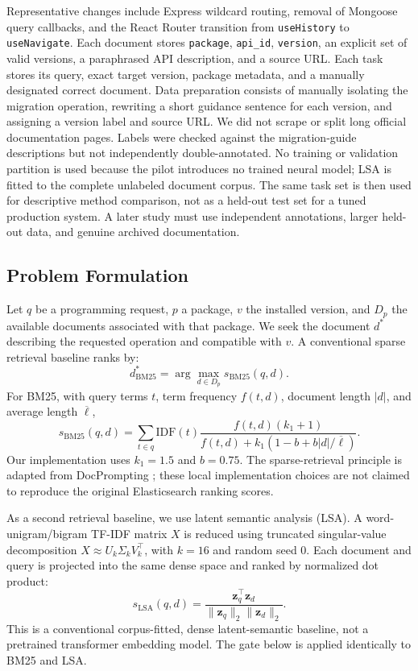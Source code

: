 \documentclass[conference]{IEEEtran}
\begin{document}
Representative changes include Express wildcard routing, removal of Mongoose query callbacks, and the React Router transition from \texttt{useHistory} to \texttt{useNavigate}. Each document stores \texttt{package}, \texttt{api\_id}, \texttt{version}, an explicit set of valid versions, a paraphrased API description, and a source URL. Each task stores its query, exact target version, package metadata, and a manually designated correct document. Data preparation consists of manually isolating the migration operation, rewriting a short guidance sentence for each version, and assigning a version label and source URL. We did not scrape or split long official documentation pages. Labels were checked against the migration-guide descriptions but not independently double-annotated. No training or validation partition is used because the pilot introduces no trained neural model; LSA is fitted to the complete unlabeled document corpus. The same task set is then used for descriptive method comparison, not as a held-out test set for a tuned production system. A later study must use independent annotations, larger held-out data, and genuine archived documentation.

\subsection{Problem Formulation}
Let $q$ be a programming request, $p$ a package, $v$ the installed version, and $D_p$ the available documents associated with that package. We seek the document $d^*$ describing the requested operation and compatible with $v$. A conventional sparse retrieval baseline ranks by:
\begin{equation}
d^*_{\mathrm{BM25}}=\arg\max_{d\in D_p} s_{\mathrm{BM25}}(q,d).
\end{equation}
For BM25, with query terms $t$, term frequency $f(t,d)$, document length $|d|$, and average length $\overline{\ell}$,
\begin{equation}
s_{\mathrm{BM25}}(q,d)=\sum_{t\in q}\mathrm{IDF}(t)
\frac{f(t,d)(k_1+1)}
{f(t,d)+k_1(1-b+b|d|/\overline{\ell})}.
\end{equation}
Our implementation uses $k_1=1.5$ and $b=0.75$. The sparse-retrieval principle is adapted from DocPrompting \cite{docprompting}; these local implementation choices are not claimed to reproduce the original Elasticsearch ranking scores.

As a second retrieval baseline, we use latent semantic analysis (LSA). A word-unigram/bigram TF-IDF matrix $X$ is reduced using truncated singular-value decomposition $X \approx U_k\Sigma_k V_k^\top$, with $k=16$ and random seed 0. Each document and query is projected into the same dense space and ranked by normalized dot product:
\begin{equation}
s_{\mathrm{LSA}}(q,d)=\frac{\mathbf z_q^{\top}\mathbf z_d}{\|\mathbf z_q\|_2\|\mathbf z_d\|_2}.
\end{equation}
This is a conventional corpus-fitted, dense latent-semantic baseline, not a pretrained transformer embedding model. The gate below is applied identically to BM25 and LSA.
\end{document}
